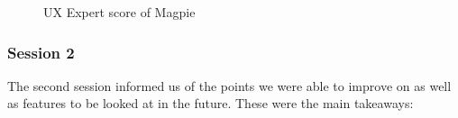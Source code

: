 \begin{figure}
    \centering
    \caption{UX Expert score of Magpie}
\end{figure}

\subsubsection{Session 2}
The second session informed us of the points we were able to improve on as well as features to be looked at in the future. These were the main takeaways:\\
